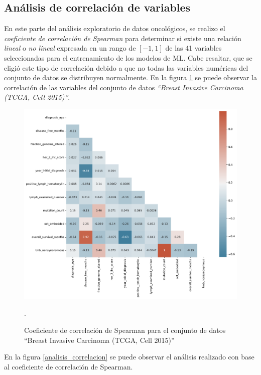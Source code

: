 \clearpage	
\newpage
\subsection{Análisis de correlación de variables }
En este parte del análisis exploratorio de datos oncológicos, se realizo el \textit{coeficiente de correlación de Spearman} para  determinar si existe una relación \textit{lineal} o \textit{no lineal} expresada en un rango de $[-1,1]$ de las 41 variables seleccionadas para el entrenamiento de los modelos de ML. Cabe resaltar, que se eligió este tipo de correlación debido a que no todas las variables numéricas del conjunto de datos se distribuyen normalmente. En la figura \ref{heatmap} se puede observar la correlación de las variables del conjunto de datos \textit{“Breast Invasive Carcinoma (TCGA, Cell 2015)”}.

\begin{figure}[htb!]
	\centering
	\includegraphics[width=1
	\linewidth]{NOTEBOOK/IMAGENES_CORRELACION/correlacion_spearman}
	\caption{Coeficiente de correlación de Spearman para el conjunto de datos “Breast Invasive Carcinoma (TCGA, Cell 2015)”}.
	\label{heatmap}
\end{figure}

En la figura \ref{analisis_correlacion} se puede observar el análisis realizado con base al coeficiente de correlación de Spearman. 

